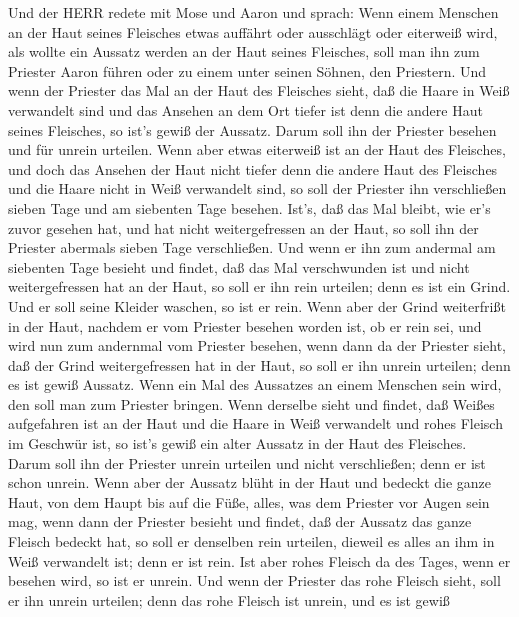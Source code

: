  Und der HERR redete mit Mose und Aaron und sprach:
 Wenn einem Menschen an der Haut seines Fleisches etwas
auffährt oder ausschlägt oder eiterweiß wird, als wollte ein Aussatz
werden an der Haut seines Fleisches, soll man ihn zum Priester Aaron
führen oder zu einem unter seinen Söhnen, den Priestern. 
Und wenn der Priester das Mal an der Haut des Fleisches sieht, daß die
Haare in Weiß verwandelt sind und das Ansehen an dem Ort tiefer ist denn
die andere Haut seines Fleisches, so ist's gewiß der Aussatz. Darum soll
ihn der Priester besehen und für unrein urteilen.  Wenn aber
etwas eiterweiß ist an der Haut des Fleisches, und doch das Ansehen der
Haut nicht tiefer denn die andere Haut des Fleisches und die Haare nicht
in Weiß verwandelt sind, so soll der Priester ihn verschließen sieben
Tage  und am siebenten Tage besehen. Ist's, daß das Mal
bleibt, wie er's zuvor gesehen hat, und hat nicht weitergefressen an der
Haut,  so soll ihn der Priester abermals sieben Tage
verschließen. Und wenn er ihn zum andermal am siebenten Tage besieht und
findet, daß das Mal verschwunden ist und nicht weitergefressen hat an
der Haut, so soll er ihn rein urteilen; denn es ist ein Grind. Und er
soll seine Kleider waschen, so ist er rein.  Wenn aber der
Grind weiterfrißt in der Haut, nachdem er vom Priester besehen worden
ist, ob er rein sei, und wird nun zum andernmal vom Priester besehen,
 wenn dann da der Priester sieht, daß der Grind
weitergefressen hat in der Haut, so soll er ihn unrein urteilen; denn es
ist gewiß Aussatz.  Wenn ein Mal des Aussatzes an einem
Menschen sein wird, den soll man zum Priester bringen. 
Wenn derselbe sieht und findet, daß Weißes aufgefahren ist an der Haut
und die Haare in Weiß verwandelt und rohes Fleisch im Geschwür ist,
 so ist's gewiß ein alter Aussatz in der Haut des
Fleisches. Darum soll ihn der Priester unrein urteilen und nicht
verschließen; denn er ist schon unrein.  Wenn aber der
Aussatz blüht in der Haut und bedeckt die ganze Haut, von dem Haupt bis
auf die Füße, alles, was dem Priester vor Augen sein mag, 
wenn dann der Priester besieht und findet, daß der Aussatz das ganze
Fleisch bedeckt hat, so soll er denselben rein urteilen, dieweil es
alles an ihm in Weiß verwandelt ist; denn er ist rein.  Ist
aber rohes Fleisch da des Tages, wenn er besehen wird, so ist er unrein.
 Und wenn der Priester das rohe Fleisch sieht, soll er ihn
unrein urteilen; denn das rohe Fleisch ist unrein, und es ist gewiß
